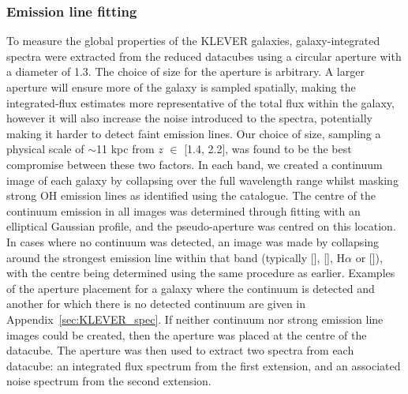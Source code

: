 \documentclass[usenatbib]{mnras} %
\begin{document}
\subsubsection{Emission line fitting}
\label{Emission_line_fit}

To measure the global properties of the KLEVER galaxies, galaxy-integrated spectra were extracted from the reduced datacubes using a circular aperture with a diameter of 1.3\arcsec. The choice of size for the aperture is arbitrary. A larger aperture will ensure more of the galaxy is sampled spatially, making the integrated-flux estimates more representative of the total flux within the galaxy, however it will also increase the noise introduced to the spectra, potentially making it harder to detect faint emission lines. Our choice of size, sampling a physical scale of $\sim$11 kpc from $z$ $\in$ [1.4, 2.2], was found to be the best compromise between these two factors. In each band, we created a continuum image of each galaxy by collapsing over the full wavelength range whilst masking strong OH emission lines as identified using the \cite{Rousselot_2000} catalogue. The centre of the continuum emission in all images was determined through fitting with an elliptical Gaussian profile, and the pseudo-aperture was centred on this location. In cases where no continuum was detected, an image was made by collapsing around the strongest emission line within that band (typically [], [], H$\alpha$ or []), with the centre being determined using the same procedure as earlier. Examples of the aperture placement for a galaxy where the continuum is detected and another for which there is no detected continuum are given in Appendix~\ref{sec:KLEVER_spec}. If neither continuum nor strong emission line images could be created, then the aperture was placed at the centre of the datacube. The aperture was then used to extract two spectra from each datacube: an integrated flux spectrum from the first extension, and an associated noise spectrum from the second extension.
\end{document}
